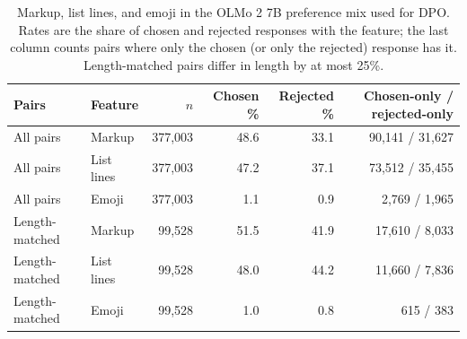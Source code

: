 \begin{table}[t]
\centering
\small
\caption{Markup, list lines, and emoji in the OLMo 2 7B preference mix used for DPO. Rates are the share of chosen and rejected responses with the feature; the last column counts pairs where only the chosen (or only the rejected) response has it. Length-matched pairs differ in length by at most 25\%.}
\label{tab:preference-markdown-7b}
\begin{tabular}{llrrrr}
\toprule
Pairs & Feature & $n$ & Chosen \% & Rejected \% & Chosen-only / rejected-only \\
\midrule
All pairs & Markup & 377,003 & 48.6 & 33.1 & 90,141 / 31,627 \\
All pairs & List lines & 377,003 & 47.2 & 37.1 & 73,512 / 35,455 \\
All pairs & Emoji & 377,003 & 1.1 & 0.9 & 2,769 / 1,965 \\
Length-matched & Markup & 99,528 & 51.5 & 41.9 & 17,610 / 8,033 \\
Length-matched & List lines & 99,528 & 48.0 & 44.2 & 11,660 / 7,836 \\
Length-matched & Emoji & 99,528 & 1.0 & 0.8 & 615 / 383 \\
\bottomrule
\end{tabular}
\end{table}
